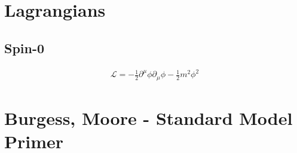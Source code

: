 \documentclass[10pt]{article}
\begin{document}
\section{Lagrangians}%
\label{sec:lagrangians}
\subsection{Spin-0}%
\label{sub:spin_0}

\begin{align}
\mathcal{L}= - \frac{1}{2} \partial^\mu\phi\partial_\mu\phi - \frac{1}{2} m^2 \phi^2
\end{align}

\section{Burgess, Moore - Standard Model Primer}%
\label{sec:burgess_moore_standard_model_primer}




















\end{document}
